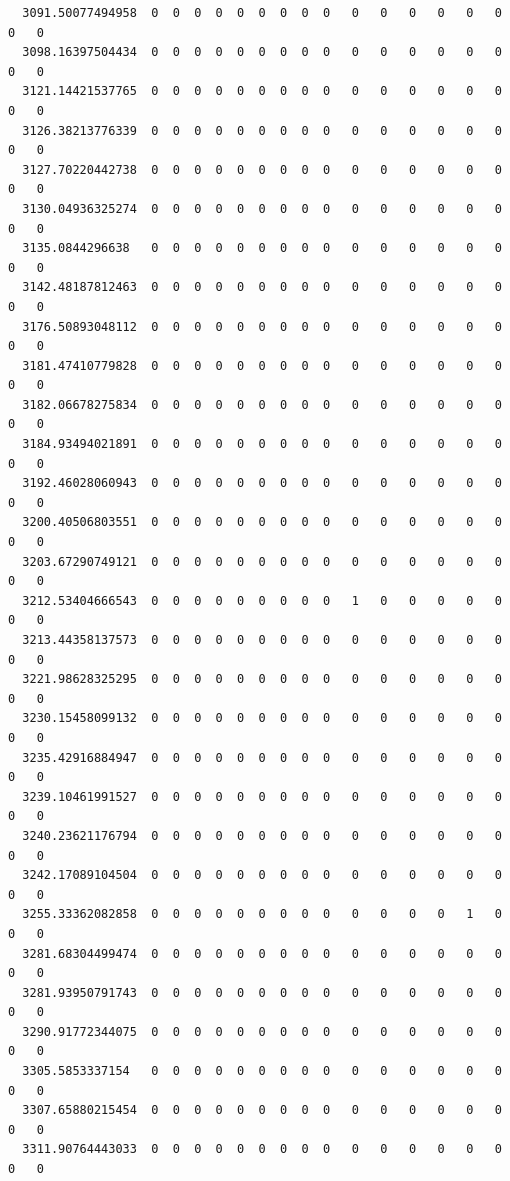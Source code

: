 \documentclass[
  letterpaper,
  DIV=11,
  numbers=noendperiod]{scrartcl}
\begin{document}
\begin{verbatim}
  3091.50077494958  0  0  0  0  0  0  0  0  0   0   0   0   0   0   0   0   0
  3098.16397504434  0  0  0  0  0  0  0  0  0   0   0   0   0   0   0   0   0
  3121.14421537765  0  0  0  0  0  0  0  0  0   0   0   0   0   0   0   0   0
  3126.38213776339  0  0  0  0  0  0  0  0  0   0   0   0   0   0   0   0   0
  3127.70220442738  0  0  0  0  0  0  0  0  0   0   0   0   0   0   0   0   0
  3130.04936325274  0  0  0  0  0  0  0  0  0   0   0   0   0   0   0   0   0
  3135.0844296638   0  0  0  0  0  0  0  0  0   0   0   0   0   0   0   0   0
  3142.48187812463  0  0  0  0  0  0  0  0  0   0   0   0   0   0   0   0   0
  3176.50893048112  0  0  0  0  0  0  0  0  0   0   0   0   0   0   0   0   0
  3181.47410779828  0  0  0  0  0  0  0  0  0   0   0   0   0   0   0   0   0
  3182.06678275834  0  0  0  0  0  0  0  0  0   0   0   0   0   0   0   0   0
  3184.93494021891  0  0  0  0  0  0  0  0  0   0   0   0   0   0   0   0   0
  3192.46028060943  0  0  0  0  0  0  0  0  0   0   0   0   0   0   0   0   0
  3200.40506803551  0  0  0  0  0  0  0  0  0   0   0   0   0   0   0   0   0
  3203.67290749121  0  0  0  0  0  0  0  0  0   0   0   0   0   0   0   0   0
  3212.53404666543  0  0  0  0  0  0  0  0  0   1   0   0   0   0   0   0   0
  3213.44358137573  0  0  0  0  0  0  0  0  0   0   0   0   0   0   0   0   0
  3221.98628325295  0  0  0  0  0  0  0  0  0   0   0   0   0   0   0   0   0
  3230.15458099132  0  0  0  0  0  0  0  0  0   0   0   0   0   0   0   0   0
  3235.42916884947  0  0  0  0  0  0  0  0  0   0   0   0   0   0   0   0   0
  3239.10461991527  0  0  0  0  0  0  0  0  0   0   0   0   0   0   0   0   0
  3240.23621176794  0  0  0  0  0  0  0  0  0   0   0   0   0   0   0   0   0
  3242.17089104504  0  0  0  0  0  0  0  0  0   0   0   0   0   0   0   0   0
  3255.33362082858  0  0  0  0  0  0  0  0  0   0   0   0   0   1   0   0   0
  3281.68304499474  0  0  0  0  0  0  0  0  0   0   0   0   0   0   0   0   0
  3281.93950791743  0  0  0  0  0  0  0  0  0   0   0   0   0   0   0   0   0
  3290.91772344075  0  0  0  0  0  0  0  0  0   0   0   0   0   0   0   0   0
  3305.5853337154   0  0  0  0  0  0  0  0  0   0   0   0   0   0   0   0   0
  3307.65880215454  0  0  0  0  0  0  0  0  0   0   0   0   0   0   0   0   0
  3311.90764443033  0  0  0  0  0  0  0  0  0   0   0   0   0   0   0   0   0
                  

\end{verbatim}
\end{document}
